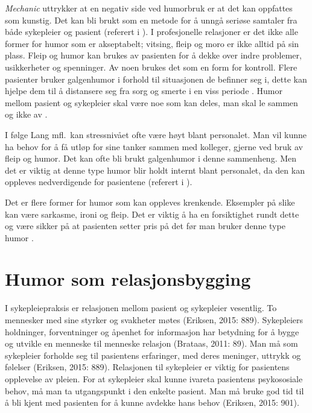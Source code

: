 \textit{Mechanic} uttrykker at en negativ side ved humorbruk er at det kan
oppfattes som kunstig. Det kan bli brukt som en metode for å unngå seriøse
samtaler fra både sykepleier og pasient (referert i ).
I profesjonelle relasjoner er det ikke alle former for humor som er
akseptabelt; vitsing, fleip og moro er ikke alltid på sin plass. Fleip og humor
kan brukes av pasienten for å dekke over indre problemer, usikkerheter og
spenninger. Av noen brukes det som en form for kontroll. Flere pasienter bruker
galgenhumor i forhold til situasjonen de befinner seg i, dette kan hjelpe dem
til å distansere seg fra sorg og smerte i en viss periode
\cite[s.~56]{bohn2000}. Humor mellom pasient og sykepleier skal være noe som
kan deles, man skal le sammen og ikke av \cite[s.~166]{wist2002}.

I følge Lang mfl.~kan stressnivået ofte være høyt blant personalet. Man vil
kunne ha behov for å få utløp for sine tanker sammen med kolleger, gjerne ved
bruk av fleip og humor. Det kan ofte bli brukt galgenhumor i denne sammenheng.
Men det er viktig at denne type humor blir holdt internt blant personalet, da
den kan oppleves nedverdigende for pasientene (referert i
).

Det er flere former for humor som kan oppleves krenkende. Eksempler på slike
kan være sarkasme, ironi og fleip. Det er viktig å ha en forsiktighet rundt
dette og være sikker på at pasienten setter pris på det før man bruker denne
type humor \cite[s.~246]{eide2008}.

\section{Humor som relasjonsbygging}

I sykepleiepraksis er relasjonen mellom pasient og sykepleier vesentlig. To
mennesker med sine styrker og svakheter møtes (Eriksen, 2015: 889). Sykepleiers
holdninger, forventninger og åpenhet for informasjon har betydning for å bygge
og utvikle en menneske til menneske relasjon (Brataas, 2011: 89). Man må som
sykepleier forholde seg til pasientens erfaringer, med deres meninger, uttrykk
og følelser (Eriksen, 2015: 889). Relasjonen til sykepleier er viktig for
pasientens opplevelse av pleien. For at sykepleier skal kunne ivareta
pasientens psykososiale behov, må man ta utgangspunkt i den enkelte pasient.
Man må bruke god tid til å bli kjent med pasienten for å kunne avdekke hans
behov (Eriksen, 2015: 901).

